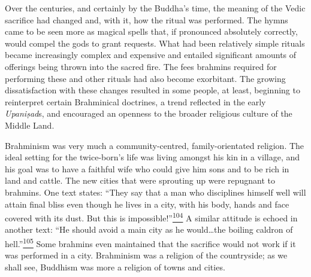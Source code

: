 Over the centuries, and certainly by the Buddha's time, the meaning of
the Vedic sacrifice had changed and, with it, how the ritual was
performed. The hymns came to be seen more as magical spells that, if
pronounced absolutely correctly, would compel the gods to grant
requests. What had been relatively simple rituals became increasingly
complex and expensive and entailed significant amounts of offerings
being thrown into the sacred fire. The fees brahmins required for
performing these and other rituals had also become exorbitant. The
growing dissatisfaction with these changes resulted in some people, at
least, beginning to reinterpret certain Brahminical doctrines, a trend
reflected in the early \emph{Upaniṣad}s, and encouraged an openness to
the broader religious culture of the Middle Land.

Brahminism was very much a community-centred, family-orientated
religion. The ideal setting for the twice-born's life was living amongst
his kin in a village, and his goal was to have a faithful wife who could
give him sons and to be rich in land and cattle. The new cities that
were sprouting up were repugnant to brahmins. One text states: ``They
say that a man who disciplines himself well will attain final bliss even
though he lives in a city, with his body, hands and face covered with
its dust. But this is
impossible!''\label{footprints_split_007.html_fnref104}\hyperref[footprints_split_024.htmlux5cux23fn104]{\textsuperscript{104}}
A similar attitude is echoed in another text: ``He should avoid a main
city as he would\ldots the boiling caldron of
hell.''\label{footprints_split_007.html_fnref105}\hyperref[footprints_split_024.htmlux5cux23fn105]{\textsuperscript{105}}
Some brahmins even maintained that the sacrifice would not work if it
was performed in a city. Brahminism was a religion of the countryside;
as we shall see, Buddhism was more a religion of towns and cities.

